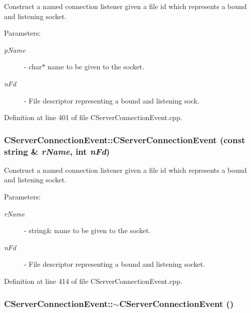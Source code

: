 Construct a named connection listener given a file id which represents a  bound and listening socket.\begin{Desc}
\item[Parameters: ]\par
\begin{description}
\item[{\em 
p\-Name}]- char$\ast$ name to be given to the socket. \item[{\em 
n\-Fd}]- File descriptor representing a bound and listening sock. \end{description}
\end{Desc}


Definition at line 401 of file CServer\-Connection\-Event.cpp.
\subsubsection{\setlength{\rightskip}{0pt plus 5cm}CServer\-Connection\-Event::CServer\-Connection\-Event (const string \& {\em r\-Name}, int {\em n\-Fd})}\label{classCServerConnectionEvent_a8}


Construct a named connection listener given a file id which represents a bound and listening socket.\begin{Desc}
\item[Parameters: ]\par
\begin{description}
\item[{\em 
r\-Name}]- string\& name to be given to the socket. \item[{\em 
n\-Fd}]- File descriptor representing a bound and listening socket. \end{description}
\end{Desc}


Definition at line 414 of file CServer\-Connection\-Event.cpp.
\subsubsection{\setlength{\rightskip}{0pt plus 5cm}CServer\-Connection\-Event::$\sim$CServer\-Connection\-Event ()}\label{classCServerConnectionEvent_a9}


